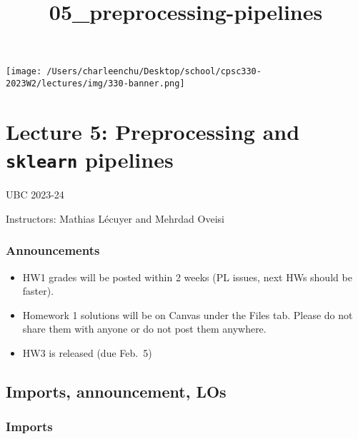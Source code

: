 \documentclass[11pt]{article}
\title{05\_preprocessing-pipelines}
\providecommand{\tightlist}{%
      \setlength{\itemsep}{0pt}\setlength{\parskip}{0pt}}
\begin{document}
    
    \maketitle
    
    

    
    \texttt{[image: /Users/charleenchu/Desktop/school/cpsc330-2023W2/lectures/img/330-banner.png]}

    \section{\texorpdfstring{Lecture 5: Preprocessing and \texttt{sklearn}
pipelines}{Lecture 5: Preprocessing and sklearn pipelines}}\label{lecture-5-preprocessing-and-sklearn-pipelines}

UBC 2023-24

Instructors: Mathias Lécuyer and Mehrdad Oveisi

    \subsubsection{Announcements}\label{announcements}

\begin{itemize}
\tightlist
\item
  HW1 grades will be posted within 2 weeks (PL issues, next HWs should
  be faster).
\item
  Homework 1 solutions will be on Canvas under the Files tab. Please do
  not share them with anyone or do not post them anywhere.
\item
  HW3 is released (due Feb.~5)
\end{itemize}

    \subsection{Imports, announcement, LOs}\label{imports-announcement-los}

    \subsubsection{Imports}\label{imports}
\end{document}
